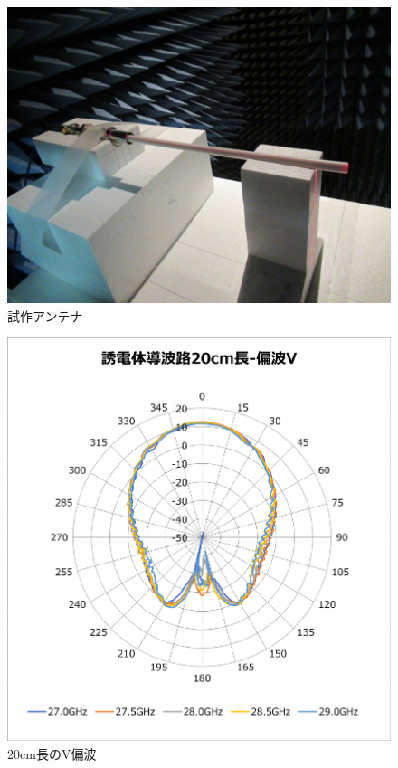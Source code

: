 \documentclass[technicalreport]{ieicej}
\begin{document}
\begin{figure}[tb]
  \begin{center}
    \includegraphics[bb=0.000000 0.000000 522.000000 402.750000, width=0.9\linewidth]{img/docomo_antenna.pdf}
    \caption{試作アンテナ}
    \label{fig:docomo_antenna}
  \end{center}
\end{figure}

\begin{figure}[tb]
  \begin{center}
    \includegraphics[bb=0 0 408 430, width=0.9\linewidth]{img/waveguide-20cm-v.pdf}
    \caption{20cm長のV偏波}
    \label{fig:20cm-v}
  \end{center}
\end{figure}
\end{document}
